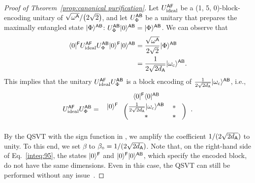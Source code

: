 \begin{proof}[Proof of Theorem~\ref{prop:canonical purification}]
    

Let $U_{\rm ideal}^{{\mathsf{A}}{\mathsf{F}}}$ be a (1, 5, 0)-block-encoding unitary of $\sqrt{\omega^{\mathsf{A}}}/\big(2\sqrt{2}\big)$, and let $U_{\Phi}^{{\mathsf{A}}{\mathsf{B}}}$ be a unitary that prepares the maximally entangled state $|\Phi\rangle^{{\mathsf{A}}{\mathsf{B}}}$: $U_{\Phi}^{{\mathsf{A}}{\mathsf{B}}}|0\rangle^{{\mathsf{A}}{\mathsf{B}}} = |\Phi\rangle^{{\mathsf{A}}{\mathsf{B}}}$.
We can observe that
\begin{align}
    \langle0|^{{\mathsf{F}}}U_{\rm ideal}^{{\mathsf{A}}{\mathsf{F}}}U_{\Phi}^{{\mathsf{A}}{\mathsf{B}}}|0\rangle^{{\mathsf{F}}}|0\rangle^{{\mathsf{A}}{\mathsf{B}}} 
    &= \frac{\sqrt{\omega^{\mathsf{A}}}}{2\sqrt{2}}|\Phi\rangle^{{\mathsf{A}}{\mathsf{B}}} \\
    &= \frac{1}{2
    \sqrt{2d_{\mathsf{A}}}}|\omega_{\rm c}\rangle^{{\mathsf{A}}{\mathsf{B}}}.
\end{align}
This implies that the unitary $U_{\rm ideal}^{{\mathsf{A}}{\mathsf{F}}}U_{\Phi}^{{\mathsf{A}}{\mathsf{B}}}$ is a block encoding of $\frac{1}{2\sqrt{2d_{\mathsf{A}}}}|\omega_{\rm c}\rangle^{{\mathsf{A}}{\mathsf{B}}}$, i.e., 
\begin{align}
\label{inteq:95}
    U_{\rm ideal}^{\sA\sF}U_{\Phi}^{\sA\sB}
    = \hspace{1mm}
\begin{blockarray}{ccc}
& \bra{0}^\sF\bra{0}^{\sA\sB}&  & \vspace{1mm}\\
\begin{block}{c(cc)}
  \ket{0}^\sF \hspace*{1mm} & \f{1}{2\sqrt{2d_\sA}}\ket{\omega_{\rm c}}^{\sA\sB} & \hspace{0mm} * \hspace{3mm}\\
   \hspace*{1mm} & * & \hspace{0mm} * \hspace{3mm}\\
\end{block}
\end{blockarray}\hspace{2.5mm}.
\end{align}
By the QSVT with the sign function in , we amplify the coefficient $1/(2\sqrt{2d_{\mathsf{A}}})$ to unity.
To this end, we set $\beta$ to $\beta_\diamond = 1/(2\sqrt{2d_{\mathsf{A}}})$.
Note that, on the right-hand side of Eq.~\eqref{inteq:95}, the states $|0\rangle^{\mathsf{F}}$ and $|0\rangle^{\mathsf{F}}|0\rangle^{{\mathsf{A}}{\mathsf{B}}}$, which specify the encoded block, do not have the same dimensions. Even in this case, the QSVT can still be performed without any issue~\cite{gilyen2019qsvt, Gilyn2019thesis, martyn2021grand}.



\end{proof}
